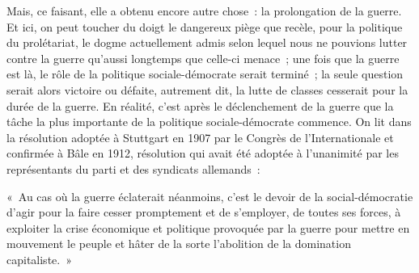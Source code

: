 \documentclass[french,twoside]{book} %
\newenvironment{quoteblock}%
  {\begin{quoting}}
  {\end{quoting}}
\newenvironment{quotebar}{%
    \def\FrameCommand{{\color{rubric!10!}\vrule width 0.5em} \hspace{0.9em}}%
    \def\OuterFrameSep{\itemsep} %
    \MakeFramed {\advance\hsize-\width \FrameRestore}
  }%
  {%
    \endMakeFramed
  }
\renewenvironment{quoteblock}%
  {%
    \savenotes
    \setstretch{0.9}
    \normalfont
    \begin{quotebar}
  }
  {%
    \end{quotebar}
    \spewnotes
  }
\begin{document}
Mais, ce faisant, elle a obtenu encore autre chose : la prolongation de la guerre. Et ici, on peut toucher du doigt le dangereux piège que recèle, pour la politique du prolétariat, le dogme actuellement admis selon lequel nous ne pouvions lutter contre la guerre qu’aussi longtemps que celle-ci menace ; une fois que la guerre est là, le rôle de la politique sociale-démocrate serait terminé ; la seule question serait alors victoire ou défaite, autrement dit, la lutte de classes cesserait pour la durée de la guerre. En réalité, c’est après le déclenchement de la guerre que la tâche la plus importante de la politique sociale-démocrate commence. On lit dans la résolution adoptée à Stuttgart en 1907 par le Congrès de l’Internationale et confirmée à Bâle en 1912, résolution qui avait été adoptée à l’unanimité par les représentants du parti et des syndicats allemands :\par

\begin{quoteblock}
 \noindent « Au cas où la guerre éclaterait néanmoins, c’est le devoir de la social-démocratie d’agir pour la faire cesser promptement et de s’employer, de toutes ses forces, à exploiter la crise économique et politique provoquée par la guerre pour mettre en mouvement le peuple et hâter de la sorte l’abolition de la domination capitaliste. »
\end{quoteblock}
\end{document}

